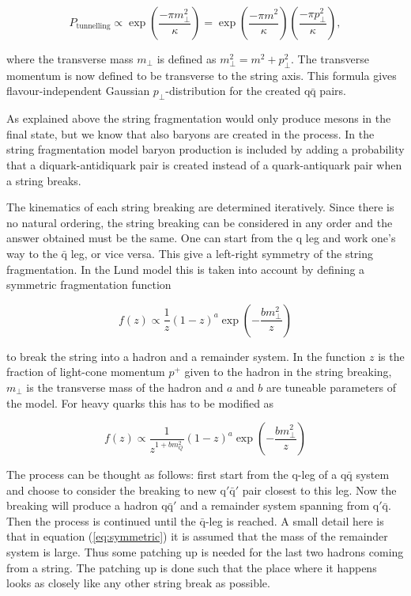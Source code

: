 \begin{equation}
P_\mathrm{tunnelling} \propto \exp \left(\frac{-\pi m_\perp^2}{\kappa} \right) = \exp \left(\frac{-\pi m^2}{\kappa} \right) \left(\frac{-\pi p_\perp^2}{\kappa} \right),
\end{equation}

where the transverse mass $m_\perp$ is defined as $m_\perp^2 = m^2 + p_\perp ^2$. The transverse momentum is now defined to be transverse to the string axis. This formula gives flavour-independent Gaussian $p_\perp$-distribution for the created $\mathrm{q \bar q}$ pairs.

As explained above the string fragmentation would only produce mesons in the final state, but we know that also baryons are created in the process. In the string fragmentation model baryon production is included by adding a probability that a diquark-antidiquark pair is created instead of a quark-antiquark pair when a string breaks.

The kinematics of each string breaking are determined iteratively. Since there is no natural ordering, the string breaking can be considered in any order and the answer obtained must be the same. One can start from the q leg and work one's way to the $\bar{\mathrm{q}}$ leg, or vice versa. This give a left-right symmetry of the string fragmentation. In the Lund model this is taken into account by defining a symmetric fragmentation function

\begin{equation}
f\left(z\right) \propto \frac{1}{z} \left(1-z\right)^a \exp \left(-\frac{b m_\perp ^2}{z} \right)
\label{eq:symmetric}
\end{equation}

to break the string into a hadron and a remainder system. In the function $z$ is the fraction of light-cone momentum $p^+$ given to the hadron in the string breaking, $m_\perp$ is the transverse mass of the hadron and $a$ and $b$ are tuneable parameters of the model. For heavy quarks this has to be modified as 

\begin{equation}
f\left(z\right) \propto \frac{1}{z^{1+bm_Q^2}} \left(1-z\right)^a \exp \left(-\frac{b m_\perp ^2}{z} \right)
\label{eq:symmetric2}
\end{equation}

The process can be thought as follows: first start from the q-leg of a $\mathrm{q \bar{q}}$ system and choose to consider the breaking to new $\mathrm{q' \bar q'}$ pair closest to this leg. Now the breaking will produce a hadron $\mathrm{q \bar{q}'}$ and a remainder system spanning from $\mathrm{q' \bar{q}}$. Then the process is continued until the $\bar{\mathrm{q}}$-leg is reached. A small detail here is that in equation (\ref{eq:symmetric}) it is assumed that the mass of the remainder system is large. Thus some patching up is needed for the last two hadrons coming from a string. The patching up is done such that the place where it happens looks as closely like any other string break as possible.


